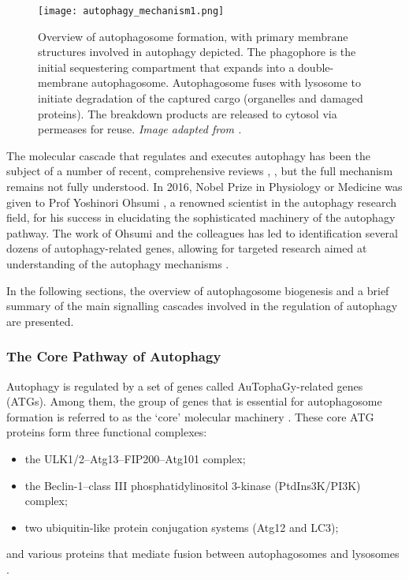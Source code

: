            \begin{figure}[!h]
            \centering
            \texttt{[image: autophagy\_mechanism1.png]}
            \caption[Overview of autophagosome formation]{Overview of autophagosome formation, with primary membrane structures involved in autophagy depicted. The phagophore is the initial sequestering compartment that expands into a double-membrane autophagosome. Autophagosome fuses with lysosome to initiate degradation of the captured cargo (organelles and damaged proteins). The breakdown products are released to cytosol via permeases for reuse. \textit{Image adapted from \cite{Feng2015}.} }
            \label{fig:autophagosome}
            \end{figure} 
            
    The molecular cascade that regulates and executes autophagy has been the subject of a number of recent, comprehensive reviews \cite{Feng2015, Abada2014}, \cite{ Fullgrabe2016, Kaur2015}, but the full mechanism remains not fully understood. In 2016, Nobel Prize in Physiology or Medicine was given to Prof Yoshinori Ohsumi \cite{The2016}, a renowned scientist in the autophagy research field, for his success in elucidating the sophisticated machinery of the autophagy pathway. The work of Ohsumi and the colleagues has led to identification several dozens of autophagy-related genes, allowing for targeted research aimed at understanding of the autophagy mechanisms \cite{Feng2015}. 

    In the following sections, the overview of autophagosome biogenesis and a brief summary of the main signalling cascades involved in the regulation of autophagy are presented. 



        \subsubsection{The Core Pathway of Autophagy } \label{section:automech}
        
        
      Autophagy is regulated by a set of genes called AuTophaGy-related genes (ATGs). Among them, the group of genes that is essential for autophagosome formation is referred to as the ‘core’ molecular machinery \cite{Xie2007}. These core ATG proteins form three functional complexes:
      \begin{itemize}
          \item the ULK1/2--Atg13--FIP200--Atg101 complex; 
          \item the Beclin-1--class III phosphatidylinositol 3-kinase (PtdIns3K/PI3K) complex; 
          \item two ubiquitin-like protein conjugation systems (Atg12 and LC3);
    \end{itemize}
    and various proteins that mediate fusion between autophagosomes and lysosomes \cite{Feng2015, Yang2010}. 

